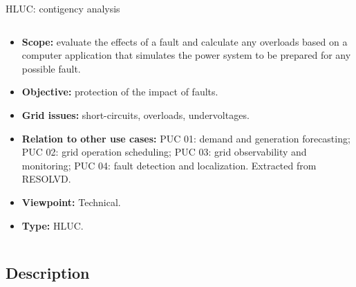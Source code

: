 \begin{frame}{HLUC: contigency analysis}
\begin{columns}
\begin{column}{0.68\textwidth}
\begin{table}[!htb]
          \begin{itemize}
            \item \textbf{Scope: } evaluate the effects of a fault and calculate any overloads based on a computer application that simulates the power system to be prepared for any possible fault.
            \item \textbf{Objective: } protection of the impact of faults.
            \item \textbf{Grid issues: } short-circuits, overloads, undervoltages.
            \item \textbf{Relation to other use cases: } PUC 01: demand and generation forecasting; PUC 02: grid operation scheduling; PUC 03: grid observability and monitoring; PUC 04: fault detection and localization. Extracted from RESOLVD.
            \item \textbf{Viewpoint: } Technical.
            \item \textbf{Type: } HLUC.
          \end{itemize}

          \caption{General description of the HLUC}
        \end{table}

      \end{column}

    \end{columns}

  \end{frame}


  \subsection{Description}

